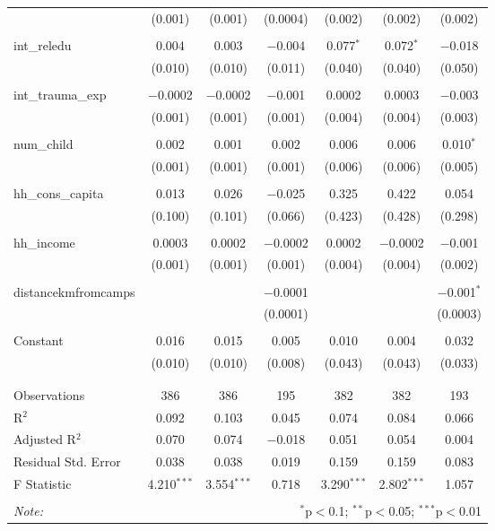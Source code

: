 \begin{table}[H]
\begin{tabular}{@{\extracolsep{4pt}}lcccccc}
  & (0.001) & (0.001) & (0.0004) & (0.002) & (0.002) & (0.002) \\ 
  & & & & & & \\ 
 int\_reledu & 0.004 & 0.003 & $-$0.004 & 0.077$^{*}$ & 0.072$^{*}$ & $-$0.018 \\ 
  & (0.010) & (0.010) & (0.011) & (0.040) & (0.040) & (0.050) \\ 
  & & & & & & \\ 
 int\_trauma\_exp & $-$0.0002 & $-$0.0002 & $-$0.001 & 0.0002 & 0.0003 & $-$0.003 \\ 
  & (0.001) & (0.001) & (0.001) & (0.004) & (0.004) & (0.003) \\ 
  & & & & & & \\ 
 num\_child & 0.002 & 0.001 & 0.002 & 0.006 & 0.006 & 0.010$^{*}$ \\ 
  & (0.001) & (0.001) & (0.001) & (0.006) & (0.006) & (0.005) \\ 
  & & & & & & \\ 
 hh\_cons\_capita & 0.013 & 0.026 & $-$0.025 & 0.325 & 0.422 & 0.054 \\ 
  & (0.100) & (0.101) & (0.066) & (0.423) & (0.428) & (0.298) \\ 
  & & & & & & \\ 
 hh\_income & 0.0003 & 0.0002 & $-$0.0002 & 0.0002 & $-$0.0002 & $-$0.001 \\ 
  & (0.001) & (0.001) & (0.001) & (0.004) & (0.004) & (0.002) \\ 
  & & & & & & \\ 
 distancekmfromcamps &  &  & $-$0.0001 &  &  & $-$0.001$^{*}$ \\ 
  &  &  & (0.0001) &  &  & (0.0003) \\ 
  & & & & & & \\ 
 Constant & 0.016 & 0.015 & 0.005 & 0.010 & 0.004 & 0.032 \\ 
  & (0.010) & (0.010) & (0.008) & (0.043) & (0.043) & (0.033) \\ 
  & & & & & & \\ 
\hline \\[-1.8ex] 
Observations & 386 & 386 & 195 & 382 & 382 & 193 \\ 
R$^{2}$ & 0.092 & 0.103 & 0.045 & 0.074 & 0.084 & 0.066 \\ 
Adjusted R$^{2}$ & 0.070 & 0.074 & $-$0.018 & 0.051 & 0.054 & 0.004 \\ 
Residual Std. Error & 0.038 & 0.038 & 0.019 & 0.159 & 0.159 & 0.083 \\ 
F Statistic & 4.210$^{***}$ & 3.554$^{***}$ & 0.718 & 3.290$^{***}$ & 2.802$^{***}$ & 1.057 \\ 
\hline 
\hline \\[-1.8ex] 
\textit{Note:}  & \multicolumn{6}{r}{$^{*}$p$<$0.1; $^{**}$p$<$0.05; $^{***}$p$<$0.01} \\ 
\end{tabular} 
\end{table} 
